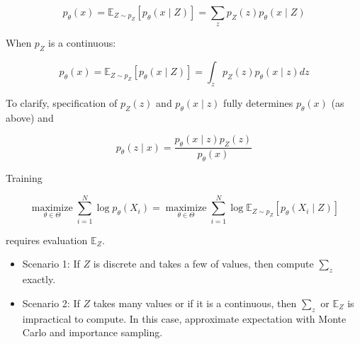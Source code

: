 \documentclass{report}
\begin{document}
\begin{definition}
    $$
    p_{\theta}(x)=\mathbb{E}_{Z \sim p_{Z}}\left[p_{\theta}(x \mid Z)\right]=\sum_{z} p_{Z}(z) p_{\theta}(x \mid Z)
    $$

    When $p_{Z}$ is a continuous:

    $$
    p_{\theta}(x)=\mathbb{E}_{Z \sim p_{Z}}\left[p_{\theta}(x \mid Z)\right]=\int_{z} p_{Z}(z) p_{\theta}(x \mid z) d z
    $$

    To clarify, specification of $p_{Z}(z)$ and $p_{\theta}(x \mid z)$ fully determines $p_{\theta}(x)$ (as above) and

    $$
    p_{\theta}(z \mid x)=\frac{p_{\theta}(x \mid z) p_{Z}(z)}{p_{\theta}(x)}
    $$

    \par\noindent\textcolor{gray}{\hdashrule{\textwidth}{0.4pt}{1pt 2pt}}

    Training

    $$
    \underset{\theta \in \Theta}{\operatorname{maximize}} \sum_{i=1}^{N} \log p_{\theta}\left(X_{i}\right)=\underset{\theta \in \Theta}{\operatorname{maximize}} \sum_{i=1}^{N} \log \mathbb{E}_{Z \sim p_{Z}}\left[p_{\theta}\left(X_{i} \mid Z\right)\right]
    $$

    requires evaluation $\mathbb{E}_{Z}$.

    \begin{itemize}
        \item Scenario 1: If $Z$ is discrete and takes a few of values, then compute $\sum_{z}$ exactly.
        \item Scenario 2: If $Z$ takes many values or if it is a continuous, then $\sum_{z}$ or $\mathbb{E}_{Z}$ is impractical to compute. In this case, approximate expectation with Monte Carlo and importance sampling.
    \end{itemize}
\end{definition}
\end{document}
